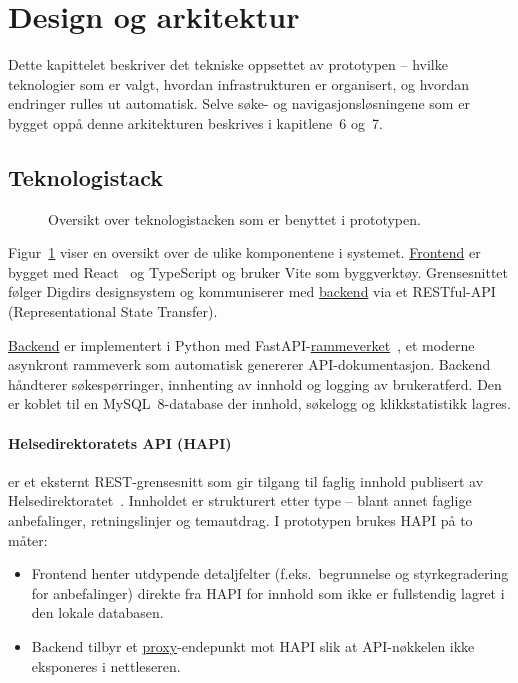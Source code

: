 \section{Design og arkitektur}



Dette kapittelet beskriver det tekniske oppsettet av prototypen -- hvilke teknologier
som er valgt, hvordan infrastrukturen er organisert, og hvordan endringer rulles ut
automatisk. Selve søke- og navigasjonsløsningene som er bygget oppå denne arkitekturen
beskrives i kapitlene~6 og~7.

\subsection{Teknologistack}

\begin{figure}[H]
    \centering
    
    \caption{Oversikt over teknologistacken som er benyttet i prototypen.}
    \label{fig:tech-stack}
\end{figure}

Figur~\ref{fig:tech-stack} viser en oversikt over de ulike komponentene i systemet.
\hyperlink{ord:frontend}{Frontend} er bygget med React~\cite{reactjs-docs} og TypeScript
og bruker Vite som byggverktøy. Grensesnittet følger Digdirs designsystem og kommuniserer
med \hyperlink{ord:backend}{backend} via et RESTful-API (Representational State Transfer).

\hyperlink{ord:backend}{Backend} er implementert i Python med
FastAPI-\hyperlink{ord:rammeverk}{rammeverket}~\cite{fastapi-docs}, et moderne
asynkront rammeverk som automatisk genererer API-dokumentasjon. Backend håndterer
søkespørringer, innhenting av innhold og logging av brukeratferd. Den er koblet til en
MySQL~8-database der innhold, søkelogg og klikkstatistikk lagres.

\paragraph{Helsedirektoratets API (HAPI)} er et eksternt REST-grensesnitt som gir
tilgang til faglig innhold publisert av Helsedirektoratet~\cite{helsedir-api-docs}.
Innholdet er strukturert etter type -- blant annet faglige anbefalinger, retningslinjer
og temautdrag. I prototypen brukes HAPI på to måter:

\begin{itemize}
    \item Frontend henter utdypende detaljfelter (f.eks.\ begrunnelse og
        styrkegradering for anbefalinger) direkte fra HAPI for innhold som ikke
        er fullstendig lagret i den lokale databasen.
    \item Backend tilbyr et \hyperlink{ord:proxy}{proxy}-endepunkt mot HAPI slik at
        API-nøkkelen ikke eksponeres i nettleseren.
\end{itemize}

